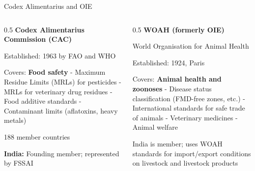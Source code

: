 \documentclass[
  ignorenonframetext,
  aspectratio=169,
]{beamer}
\makeatletter
\let\quarto@originallabel\label
\DeclareRobustCommand*{\label}[1]{\quarto@originallabel{#1}}
\makeatother
\begin{document}
\begin{frame}{Codex Alimentarius and OIE}
\label{codex-alimentarius-and-oie}
\begin{columns}[T]
\begin{column}{0.5\linewidth}
\textbf{Codex Alimentarius Commission (CAC)}

Established: 1963 by FAO and WHO

Covers: \textbf{Food safety} - Maximum Residue Limits (MRLs) for
pesticides - MRLs for veterinary drug residues - Food additive standards
- Contaminant limits (aflatoxins, heavy metals)

188 member countries

\textbf{India:} Founding member; represented by FSSAI
\end{column}

\begin{column}{0.5\linewidth}
\textbf{WOAH (formerly OIE)}

World Organisation for Animal Health

Established: 1924, Paris

Covers: \textbf{Animal health and zoonoses} - Disease status
classification (FMD-free zones, etc.) - International standards for safe
trade of animals - Veterinary medicines - Animal welfare

India is member; uses WOAH standards for import/export conditions on
livestock and livestock products
\end{column}
\end{columns}
\end{frame}
\end{document}
